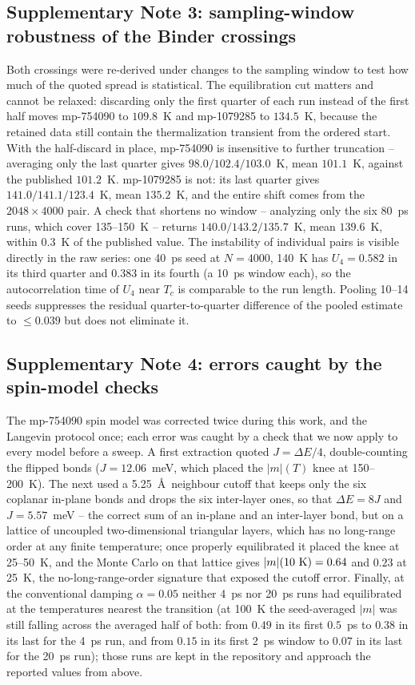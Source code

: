 \documentclass[aps,prb,preprint,superscriptaddress,longbibliography,nofootinbib]{revtex4-2}
\begin{document}
\subsection*{Supplementary Note 3: sampling-window robustness of the Binder crossings}

Both crossings were re-derived under changes to the sampling window to test how much of the quoted spread is
statistical. The equilibration cut matters and cannot be relaxed: discarding only the first quarter of each run
instead of the first half moves mp-754090 to $109.8$~K and mp-1079285 to $134.5$~K, because the retained data
still contain the thermalization transient from the ordered start. With the half-discard in place, mp-754090 is
insensitive to further truncation -- averaging only the last quarter gives $98.0/102.4/103.0$~K, mean
$101.1$~K, against the published $101.2$~K. mp-1079285 is not: its last quarter gives $141.0/141.1/123.4$~K,
mean $135.2$~K, and the entire shift comes from the $2048\times4000$ pair. A check that shortens no window --
analyzing only the six 80~ps runs, which cover 135--150~K -- returns $140.0/143.2/135.7$~K, mean $139.6$~K,
within $0.3$~K of the published value. The instability of individual pairs is visible directly in the raw
series: one 40~ps seed at $N=4000$, 140~K has $U_4=0.582$ in its third quarter and $0.383$ in its fourth (a
10~ps window each), so the autocorrelation time of $U_4$ near $T_c$ is comparable to the run length. Pooling
10--14 seeds suppresses the residual quarter-to-quarter difference of the pooled estimate to $\le0.039$ but does
not eliminate it.

\subsection*{Supplementary Note 4: errors caught by the spin-model checks}

The mp-754090 spin model was corrected twice during this work, and the Langevin protocol once; each error was
caught by a check that we now apply to every model before a sweep. A first extraction quoted $J=\Delta E/4$,
double-counting the flipped bonds ($J=12.06$~meV, which placed the $|m|(T)$ knee at 150--200~K). The next used
a 5.25~\AA\ neighbour cutoff that keeps only the six coplanar in-plane bonds and drops the six inter-layer ones,
so that $\Delta E = 8J$ and $J=5.57$~meV -- the correct sum of an in-plane and an inter-layer bond, but on a
lattice of uncoupled two-dimensional triangular layers, which has no long-range order at any finite
temperature; once properly equilibrated it placed the knee at 25--50~K, and the Monte Carlo on that lattice
gives $|m|(10~{\rm K})=0.64$ and $0.23$ at 25~K, the no-long-range-order signature that exposed the cutoff
error. Finally, at the conventional damping $\alpha=0.05$ neither 4~ps nor 20~ps runs had equilibrated at the
temperatures nearest the transition (at 100~K the seed-averaged $|m|$ was still falling across the averaged
half of both: from $0.49$ in its first $0.5$~ps to $0.38$ in its last for the 4~ps run, and from $0.15$ in its
first 2~ps window to $0.07$ in its last for the 20~ps run); those runs are kept
in the repository and approach the reported values
from above.
\end{document}
